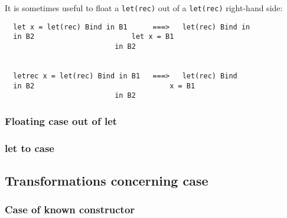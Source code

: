 \documentclass[11pt]{article}
\begin{document}
It is sometimes useful to float a \texttt{let(rec)} out of a \texttt{let(rec)} right-hand
side:
\begin{lstlisting}
  let x = let(rec) Bind in B1	   ===>   let(rec) Bind in
  in B2				          let x = B1
				          in B2


  letrec x = let(rec) Bind in B1   ===>   let(rec) Bind
  in B2				                   x = B1
				          in B2
\end{lstlisting}

\subsubsection{Floating case out of let}

  
\subsubsection{let to case}


\subsection{Transformations concerning case}

\subsubsection{Case of known constructor}
\end{document}
